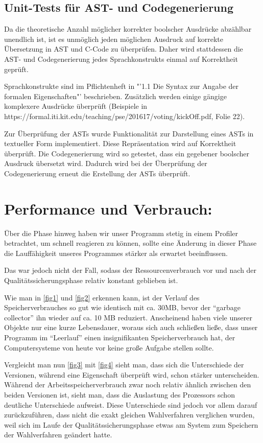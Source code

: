 \documentclass[a4paper]{scrreprt}
\begin{document}
\section{Unit-Tests für AST- und Codegenerierung}
Da die theoretische Anzahl möglicher korrekter boolscher Ausdrücke abzählbar unendlich ist, ist es unmöglich jeden möglichen Ausdruck auf korrekte Übersetzung in AST und C-Code zu überprüfen. Daher wird stattdessen die AST- und Codegenerierung jedes Sprachkonstrukts einmal auf Korrektheit geprüft. 

Sprachkonstrukte sind im Pflichtenheft in "'1.1 Die Syntax zur Angabe der formalen Eigenschaften"' beschrieben. Zusätzlich werden einige gängige komplexere Ausdrücke überprüft (Beispiele in https://formal.iti.kit.edu/teaching/pse/201617/voting/kickOff.pdf, Folie 22). 

Zur Überprüfung der ASTs wurde Funktionalität zur Darstellung eines ASTs in textueller Form implementiert. Diese Repräsentation wird auf Korrektheit überprüft. Die Codegenerierung wird so getestet, dass ein gegebener boolscher Ausdruck übersetzt wird. Dadurch wird bei der Überprüfung der Codegenerierung erneut die Erstellung der ASTs überprüft. 

\chapter{Performance und Verbrauch:}
Über die Phase hinweg haben wir unser Programm stetig in einem Profiler betrachtet, um
schnell reagieren zu können, sollte eine Änderung in dieser Phase die
Lauffähigkeit unseres Programmes stärker als erwartet beeinflussen.

Das war jedoch nicht der Fall, sodass der Ressourcenverbrauch vor und nach der
Qualitätssicherungsphase relativ konstant geblieben ist.

Wie man in \ref{fig1} und \ref{fig2} erkennen kann, ist der Verlauf des
Speicherverbrauches so gut wie identisch mit ca. 30MB, bevor der "`garbage
collector"' ihn wieder auf ca. 10 MB reduziert. Anscheinend haben viele
unserer Objekte nur eine kurze Lebensdauer, woraus sich auch schließen ließe,
dass unser Programm im "`Leerlauf"' einen insignifikanten Speicherverbrauch hat,
der Computersysteme von heute vor keine große Aufgabe stellen sollte.

Vergleicht man nun \ref{fig3} mit \ref{fig4} sieht man, dass sich die
Unterschiede der Versionen, während eine Eigenschaft überprüft wird, schon
stärker unterscheiden. Während der Arbeitsspeicherverbrauch zwar noch relativ
ähnlich zwischen den beiden Versionen ist, sieht man, dass die Auslastung des
Prozessors schon deutliche Unterschiede aufweist. Diese Unterschiede sind jedoch vor allem darauf
zurückzuführen, dass nicht die exakt gleichen Wahlverfahren verglichen
wurden, weil sich im Laufe der Qualitätssicherungsphase etwas am System zum
Speichern der Wahlverfahren geändert hatte.
\end{document}
